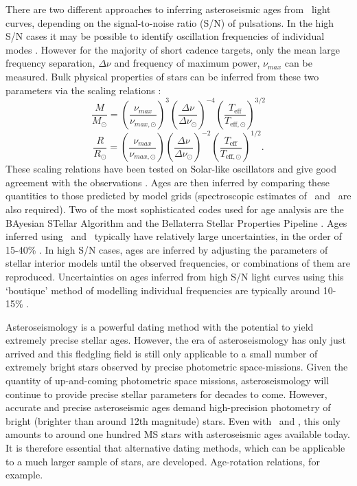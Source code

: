 There are two different approaches to inferring asteroseismic ages from
\kepler\ light curves, depending on the signal-to-noise ratio (S/N) of
pulsations.
In the high S/N cases it may be possible to identify
oscillation frequencies of individual modes \citep[\eg][]{Metcalfe2010,
Silva-aguirre2012, Lebreton2014}.
However for the majority of short cadence targets, only the
mean large frequency separation, $\Delta\nu$ and frequency of maximum power,
$\nu_{max}$ can be measured.
Bulk physical properties of stars can be inferred from these two parameters
via the scaling relations \citep{Brown1991, Kjeldsen1995}:
\begin{equation}
    \frac{M}{M_\odot} = \left(\frac{\nu_{max}}{\nu_{max,\odot}}\right)^3
    \left(\frac{\Delta\nu}{\Delta\nu_\odot}\right)^{-4}
    \left(\frac{T_{\mathrm{eff}}}{T_{\mathrm{eff},\odot}}\right)^{3/2}
\end{equation}
\begin{equation}
    \frac{R}{R_\odot} = \left(\frac{\nu_{max}}{\nu_{max,\odot}}\right)
    \left(\frac{\Delta\nu}{\Delta\nu_\odot}\right)^{-2}
    \left(\frac{T_{\mathrm{eff}}}{T_{\mathrm{eff},\odot}}\right)^{1/2}.
\end{equation}
These scaling relations have been tested on Solar-like oscillators and give
good agreement with the observations \citep[\eg][]{Chaplin2013, Coelho2015}.
Ages are then inferred by comparing these quantities to those predicted by
model grids (spectroscopic estimates of \teff\ and \feh\ are also required).
Two of the most sophisticated codes used for age analysis are the BAyesian
STellar Algorithm \citep[BASTA][]{Silva-aguirre2015} and the Bellaterra
Stellar Properties Pipeline \citep{Serenelli2013}.
Ages inferred using \dnu\ and \numax\ typically have relatively large
uncertainties, in the order of 15-40\% \citep{Silva-aguirre2015a}.
In high S/N cases, ages are inferred by adjusting the parameters of stellar
interior models \citep[\eg][]{Kjeldsen2008} until the observed frequencies, or
combinations of them are reproduced.
Uncertainties on ages inferred from high S/N light curves using this
`boutique' method of modelling individual frequencies are typically around
10-15\% \citep{Silva-aguirre2015a}.

Asteroseismology is a powerful dating method with the potential to yield
extremely precise stellar ages.
However, the era of asteroseismology has only just arrived and this fledgling
field is still only applicable to a small number of extremely bright stars
observed by precise photometric space-missions.
Given the quantity of up-and-coming photometric space missions,
asteroseismology will continue to provide precise stellar parameters for
decades to come.
However, accurate and precise asteroseismic ages demand high-precision
photometry of bright (brighter than around 12th magnitude) stars.
Even with \kepler\ and \corot, this only amounts to around one hundred MS
stars with asteroseismic ages available today.
It is therefore essential that alternative dating methods, which can be
applicable to a much larger sample of stars, are developed.
Age-rotation relations, for example.

